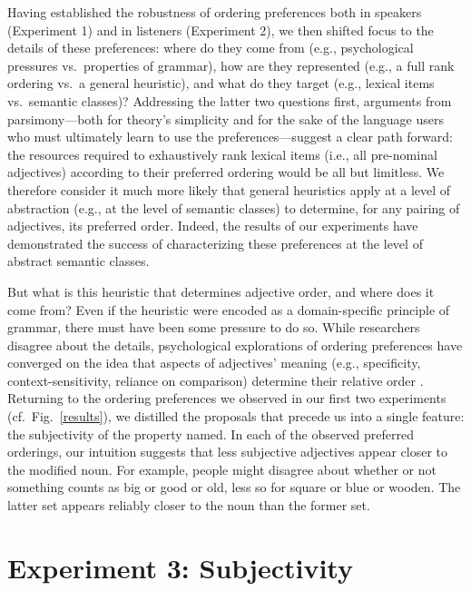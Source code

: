 \documentclass{pnastwo}
\begin{document}
\begin{article}
Having established the robustness of ordering preferences both in speakers (Experiment 1) and in listeners (Experiment 2), we then shifted focus to the details of these preferences: where do they come from (e.g., psychological pressures vs.~properties of grammar), how are they represented (e.g., a full rank ordering vs.~a general heuristic), and what do they target (e.g., lexical items vs.~semantic classes)? Addressing the latter two questions first, arguments from parsimony---both for theory's simplicity and for the sake of the language users who must ultimately learn to use the preferences---suggest a clear path forward: the resources required to exhaustively rank lexical items (i.e., all pre-nominal adjectives) according to their preferred ordering would be all but limitless. We therefore consider it much more likely that general heuristics apply at a level of abstraction (e.g., at the level of semantic classes) to determine, for any pairing of adjectives, its preferred order.  Indeed, the results of our experiments have demonstrated the success of characterizing these preferences at the level of abstract semantic classes.

But what is this heuristic that determines adjective order, and where does it come from? Even if the heuristic were encoded as a domain-specific principle of grammar, there must have been some pressure to do so. While researchers disagree about the details, psychological explorations of ordering preferences have converged on the idea that aspects of  adjectives' meaning (e.g., specificity, context-sensitivity, reliance on comparison) determine their relative order \cite{sweet1898,ziff1960,martin1969determinants,martin1969competence,martin1970,kemmereretal2009}. Returning to the ordering preferences we observed in our first two experiments (cf.~Fig.~\ref{results}),
we distilled the proposals that precede us into a single feature: the subjectivity of the property named. In each of the observed preferred orderings, our intuition suggests that less subjective adjectives appear closer to the modified noun. For example, people might disagree about whether or not something counts as big or good or old, less so for square or blue or wooden. The latter set appears reliably closer to the noun than the former set.
	
\section{Experiment 3: Subjectivity} 


\end{article}
\end{document}
